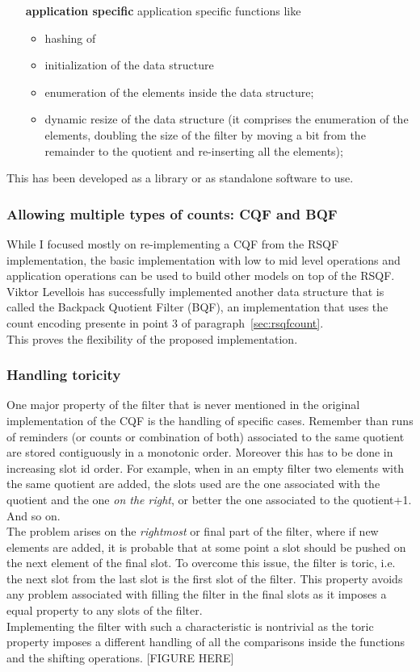 \begin{itemize}
\begin{itemize}
	\end{itemize}
	\item[\textbf{application specific}] application specific functions like
	\begin{itemize}
		\item hashing of \kmers
		\item initialization of the data structure
		\item enumeration of the elements inside the data structure;
		\item dynamic resize of the data structure (it comprises the enumeration of the elements, doubling the size of the filter by moving a bit from the remainder to the quotient and re-inserting all the elements);
	\end{itemize} 
\end{itemize}
This has been developed as a library or as standalone software to use.
\subsubsection{Allowing multiple types of counts: CQF and BQF}
While I focused mostly on re-implementing a CQF from the RSQF implementation, the basic implementation with low to mid level operations and application operations can be used to build other models on top of the RSQF. Viktor Levellois has successfully implemented another data structure that is called the Backpack Quotient Filter (BQF), an implementation that uses the count encoding presente in point 3 of paragraph~\ref{sec:rsqfcount}.\\
This proves the flexibility of the proposed implementation.
\subsubsection{Handling toricity}
One major property of the filter that is never mentioned in the original implementation of the CQF is the handling of specific cases. Remember than runs of reminders (or counts or combination of both) associated to the same quotient are stored contiguously in a monotonic order. Moreover this has to be done in increasing slot id order. For example, when in an empty filter two elements with the same quotient are added, the slots used are the one associated with the quotient and the one \emph{on the right}, or better the one associated to the quotient+1. And so on.\\
The problem arises on the \emph{rightmost} or final part of the filter, where if new elements are added, it is probable that at some point a slot should be pushed on the next element of the final slot. To overcome this issue, the filter is toric, i.e. the next slot from the last slot is the first slot of the filter. This property avoids any problem associated with filling the filter in the final slots as it imposes a equal property to any slots of the filter.\\
Implementing the filter with such a characteristic is nontrivial as the toric property imposes a different handling of all the comparisons inside the functions and the shifting operations.
[FIGURE HERE] 
